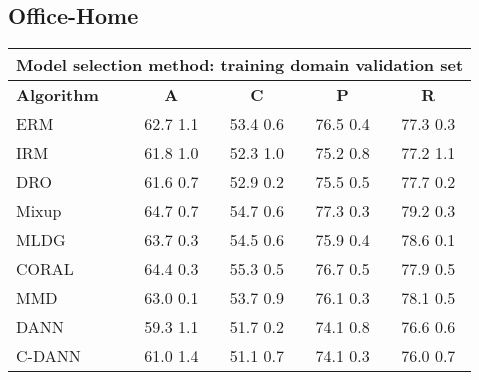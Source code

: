 \documentclass{article}
\begin{document}
\subsection{Office-Home}
\begin{center}
\begin{tabular}{lcccc}
\toprule
\multicolumn{5}{c}{\textbf{Model selection method: training domain validation set}} \\
\midrule
\textbf{Algorithm}    & \textbf{A}                & \textbf{C}                & \textbf{P}                & \textbf{R}                \\
\midrule
ERM                       & 62.7  1.1            & 53.4  0.6            & 76.5  0.4            & 77.3  0.3            \\
IRM                       & 61.8  1.0            & 52.3  1.0            & 75.2  0.8            & 77.2  1.1            \\
DRO                 & 61.6  0.7            & 52.9  0.2            & 75.5  0.5            & 77.7  0.2            \\
Mixup                     & 64.7  0.7            & 54.7  0.6            & 77.3  0.3            & 79.2  0.3            \\
MLDG                      & 63.7  0.3            & 54.5  0.6            & 75.9  0.4            & 78.6  0.1            \\
CORAL                     & 64.4  0.3            & 55.3  0.5            & 76.7  0.5            & 77.9  0.5            \\
MMD                       & 63.0  0.1            & 53.7  0.9            & 76.1  0.3            & 78.1  0.5            \\
DANN                       & 59.3  1.1            & 51.7  0.2            & 74.1  0.8            & 76.6  0.6            \\
C-DANN                   & 61.0  1.4            & 51.1  0.7            & 74.1  0.3            & 76.0  0.7            \\
\bottomrule
\end{tabular}
\end{center}
\end{document}
